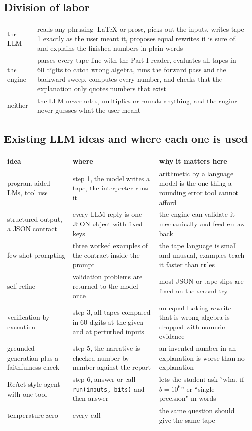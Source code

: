\documentclass[11pt]{article}
\begin{document}
\subsection*{Division of labor}
\begin{center}
\begin{tabularx}{\textwidth}{@{}lX@{}}
\toprule
the LLM & reads any phrasing, LaTeX or prose, picks out the inputs, writes tape 1 exactly as the user meant it, proposes equal rewrites it is sure of, and explains the finished numbers in plain words \\
the engine & parses every tape line with the Part I reader, evaluates all tapes in 60 digits to catch wrong algebra, runs the forward pass and the backward sweep, computes every number, and checks that the explanation only quotes numbers that exist \\
neither & the LLM never adds, multiplies or rounds anything, and the engine never guesses what the user meant \\
\bottomrule
\end{tabularx}
\end{center}

\subsection*{Existing LLM ideas and where each one is used}
\begin{center}
\small
\begin{tabularx}{\textwidth}{@{}lXX@{}}
\toprule
idea & where & why it matters here \\
\midrule
program aided LMs, tool use & step 1, the model writes a tape, the interpreter runs it & arithmetic by a language model is the one thing a rounding error tool cannot afford \\
structured output, a JSON contract & every LLM reply is one JSON object with fixed keys & the engine can validate it mechanically and feed errors back \\
few shot prompting & three worked examples of the contract inside the prompt & the tape language is small and unusual, examples teach it faster than rules \\
self refine & validation problems are returned to the model once & most JSON or tape slips are fixed on the second try \\
verification by execution & step 3, all tapes compared in 60 digits at the given and at perturbed inputs & an equal looking rewrite that is wrong algebra is dropped with numeric evidence \\
grounded generation plus a faithfulness check & step 5, the narrative is checked number by number against the report & an invented number in an explanation is worse than no explanation \\
ReAct style agent with one tool & step 6, answer or call \texttt{run(inputs, bits)} and then answer & lets the student ask ``what if $b = 10^6$'' or ``single precision'' in words \\
temperature zero & every call & the same question should give the same tape \\
\bottomrule
\end{tabularx}
\end{center}
\end{document}
